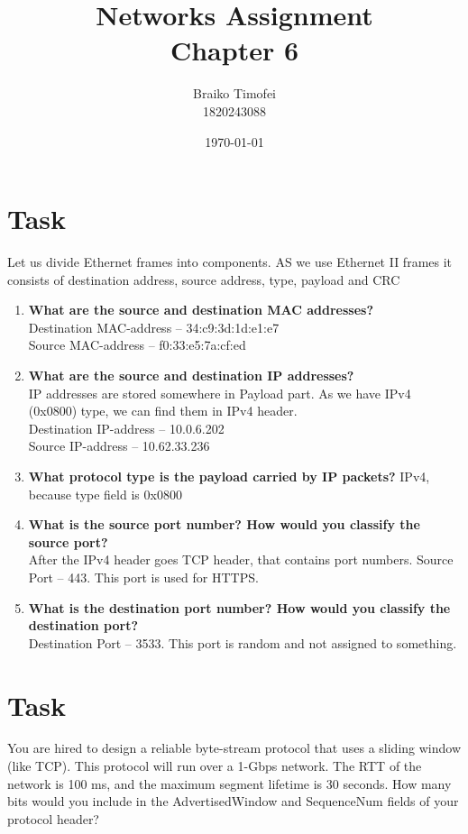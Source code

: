\documentclass[11pt]{article}
\title{Networks Assignment\\ Chapter 6}
\author{Braiko Timofei\\1820243088}
\date{\today}
\begin{document}
    \section{Task}\label{sec:task_1}
    Let us divide Ethernet frames into components.
    AS we use Ethernet II frames it consists of
    destination address, source address, type, payload and CRC

    \begin{enumerate}[label=(\alph*)]
        \item \textbf{What are the source and destination MAC addresses?} \\
        Destination MAC-address -- 34:c9:3d:1d:e1:e7 \\ Source MAC-address -- f0:33:e5:7a:cf:ed
        \item \textbf{What are the source and destination IP addresses?} \\
        IP addresses are stored somewhere in Payload part.
        As we have IPv4 (0x0800) type, we can find them in IPv4 header. \\
        Destination IP-address -- 10.0.6.202 \\ Source IP-address -- 10.62.33.236
        \item \textbf{What protocol type is the payload carried by IP packets?}
        IPv4, because type field is 0x0800
        \item \textbf{What is the source port number? How would you classify the source port?} \\
        After the IPv4 header goes TCP header, that contains port numbers.
        Source Port -- 443. This port is used for HTTPS.
        \item \textbf{What is the destination port number? How would you classify the destination port?}  \\
        Destination Port -- 3533. This port is random and not assigned to something.
    \end{enumerate}
    \newpage


    \section{Task}\label{sec:task_2}
    You are hired to design a reliable byte-stream protocol that uses a sliding window (like TCP).
    This protocol will run over a 1-Gbps network.
    The RTT of the network is 100 ms, and the maximum segment lifetime is 30 seconds.
    How many bits would you include in the AdvertisedWindow and SequenceNum fields of your protocol header?
\end{document}
